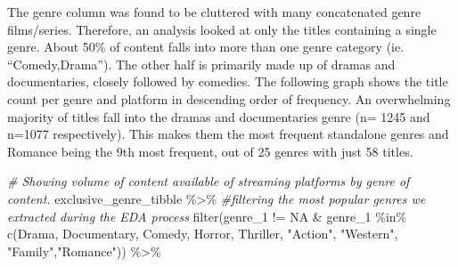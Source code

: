 \documentclass[
]{article}
\newenvironment{Shaded}{\begin{snugshade}}{\end{snugshade}}
\newcommand{\CommentTok}[1]{\textcolor[rgb]{0.56,0.35,0.01}{\textit{#1}}}
\newcommand{\FunctionTok}[1]{\textcolor[rgb]{0.00,0.00,0.00}{#1}}
\newcommand{\NormalTok}[1]{#1}
\newcommand{\SpecialCharTok}[1]{\textcolor[rgb]{0.00,0.00,0.00}{#1}}
\newcommand{\StringTok}[1]{\textcolor[rgb]{0.31,0.60,0.02}{#1}}
\begin{document}
The genre column was found to be cluttered with many concatenated genre
films/series. Therefore, an analysis looked at only the titles
containing a single genre. About 50\% of content falls into more than
one genre category (ie. ``Comedy,Drama''). The other half is primarily
made up of dramas and documentaries, closely followed by comedies. The
following graph shows the title count per genre and platform in
descending order of frequency. An overwhelming majority of titles fall
into the dramas and documentaries genre (n= 1245 and n=1077
respectively). This makes them the most frequent standalone genres and
Romance being the 9th most frequent, out of 25 genres with just 58
titles.

\begin{Shaded}
\begin{Highlighting}[]
\CommentTok{\# Showing volume of content available of streaming platforms by genre of content. }
\NormalTok{exclusive\_genre\_tibble }\SpecialCharTok{\%\textgreater{}\%} 
  \CommentTok{\#filtering the most popular genres we extracted during the EDA process}
  \FunctionTok{filter}\NormalTok{(genre\_1 }\SpecialCharTok{!=} \StringTok{\textquotesingle{}NA\textquotesingle{}} \SpecialCharTok{\&}\NormalTok{ genre\_1 }\SpecialCharTok{\%in\%} \FunctionTok{c}\NormalTok{(}\StringTok{\textquotesingle{}Drama\textquotesingle{}}\NormalTok{, }\StringTok{\textquotesingle{}Documentary\textquotesingle{}}\NormalTok{, }\StringTok{\textquotesingle{}Comedy\textquotesingle{}}\NormalTok{, }\StringTok{\textquotesingle{}Horror\textquotesingle{}}\NormalTok{, }\StringTok{\textquotesingle{}Thriller\textquotesingle{}}\NormalTok{, }\StringTok{"Action"}\NormalTok{, }\StringTok{"Western"}\NormalTok{, }\StringTok{"Family"}\NormalTok{,}\StringTok{"Romance"}\NormalTok{)) }\SpecialCharTok{\%\textgreater{}\%} 
  

\end{Highlighting}
\end{Shaded}
\end{document}
